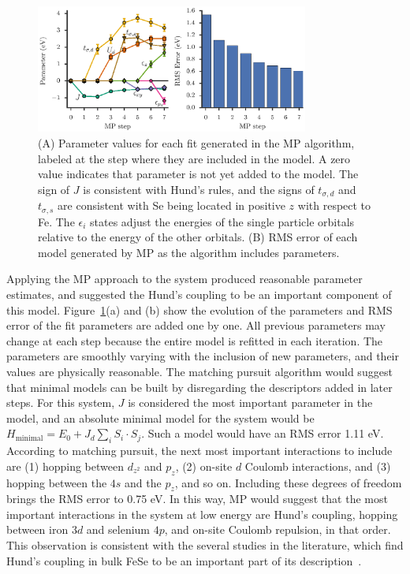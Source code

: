 \begin{figure}
  \centering
  \includegraphics[width=0.8\textwidth]{./Figures/fese.eps}
  \caption{
    \label{fig:fese} 
    (A) Parameter values for each fit generated in the MP algorithm, labeled at the step where they are included in the model. 
    A zero value indicates that parameter is not yet added to the model.
    The sign of $J$ is consistent with Hund's rules, and the signs of $t_{\sigma,d}$ and $t_{\sigma,s}$ are consistent with Se being located in positive $z$ with respect to Fe. 
    The $\epsilon_i$ states adjust the energies of the single particle orbitals relative to the energy of the other orbitals.
    (B) RMS error of each model generated by MP as the algorithm includes parameters. 
  }
\end{figure}

Applying the MP approach to the system produced reasonable parameter estimates, and suggested the Hund's coupling to be an important component of this model.
Figure~\ref{fig:fese}(a) and (b) show the evolution of the parameters and RMS error of the fit parameters are added one by one.
All previous parameters may change at each step because the entire model is refitted in each iteration.
The parameters are smoothly varying with the inclusion of new parameters, and their values are physically reasonable.
The matching pursuit algorithm would suggest that minimal models can be built by disregarding the descriptors added in later steps.
For this system, $J$ is considered the most important parameter in the model, and an absolute minimal model for the system would be $H_\text{minimal} = E_0 + J_d \sum_i S_i \cdot S_j$. 
Such a model would have an RMS error 1.11 eV. 
According to matching pursuit, the next most important interactions to include are (1) hopping between $d_{z^2}$ and $p_z$, (2) on-site $d$ Coulomb interactions, and (3) hopping between the $4s$ and the $p_z$, and so on. 
Including these degrees of freedom brings the RMS error to 0.75 eV. 
In this way, MP would suggest  that the most important interactions in the system at low energy are Hund's coupling, hopping between iron $3d$ and selenium $4p$, and on-site Coulomb repulsion, in that order.
This observation is consistent with the several studies in the literature, which find Hund's coupling in bulk FeSe to be an important part of its description~\cite{demedici_hunds_2011,de_medici_janus-faced_2011,georges_strong_2013,busemeyer_competing_2016}.

